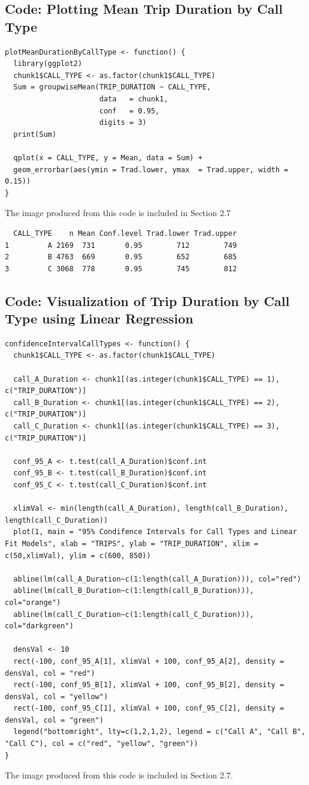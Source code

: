 \documentclass{article}
\numberwithin{equation}{section}
\begin{document}
\subsection{Code: Plotting Mean Trip Duration by Call Type} 

\begin{lstlisting}
plotMeanDurationByCallType <- function() {
  library(ggplot2)
  chunk1$CALL_TYPE <- as.factor(chunk1$CALL_TYPE)
  Sum = groupwiseMean(TRIP_DURATION ~ CALL_TYPE,
                      data   = chunk1,
                      conf   = 0.95,
                      digits = 3)
  print(Sum)
  
  qplot(x = CALL_TYPE, y = Mean, data = Sum) +
  geom_errorbar(aes(ymin = Trad.lower, ymax  = Trad.upper, width = 0.15))
}  
\end{lstlisting}
The image produced from this code is included in Section 2.7 
\begin{verbatim}
  CALL_TYPE    n Mean Conf.level Trad.lower Trad.upper
1         A 2169  731       0.95        712        749
2         B 4763  669       0.95        652        685
3         C 3068  778       0.95        745        812    
\end{verbatim}

\subsection{Code: Visualization of Trip Duration by Call Type using Linear Regression} 
\begin{lstlisting}
confidenceIntervalCallTypes <- function() { 
  chunk1$CALL_TYPE <- as.factor(chunk1$CALL_TYPE)
  
  call_A_Duration <- chunk1[(as.integer(chunk1$CALL_TYPE) == 1), c("TRIP_DURATION")]
  call_B_Duration <- chunk1[(as.integer(chunk1$CALL_TYPE) == 2), c("TRIP_DURATION")]
  call_C_Duration <- chunk1[(as.integer(chunk1$CALL_TYPE) == 3), c("TRIP_DURATION")]
  
  conf_95_A <- t.test(call_A_Duration)$conf.int
  conf_95_B <- t.test(call_B_Duration)$conf.int
  conf_95_C <- t.test(call_C_Duration)$conf.int

  xlimVal <- min(length(call_A_Duration), length(call_B_Duration), length(call_C_Duration))
  plot(1, main = "95% Condifence Intervals for Call Types and Linear Fit Models", xlab = "TRIPS", ylab = "TRIP_DURATION", xlim = c(50,xlimVal), ylim = c(600, 850))
  
  abline(lm(call_A_Duration~c(1:length(call_A_Duration))), col="red")
  abline(lm(call_B_Duration~c(1:length(call_B_Duration))), col="orange")
  abline(lm(call_C_Duration~c(1:length(call_C_Duration))), col="darkgreen")
  
  densVal <- 10
  rect(-100, conf_95_A[1], xlimVal + 100, conf_95_A[2], density = densVal, col = "red")
  rect(-100, conf_95_B[1], xlimVal + 100, conf_95_B[2], density = densVal, col = "yellow")
  rect(-100, conf_95_C[1], xlimVal + 100, conf_95_C[2], density = densVal, col = "green")
  legend("bottomright", lty=c(1,2,1,2), legend = c("Call A", "Call B", "Call C"), col = c("red", "yellow", "green"))
}
\end{lstlisting}
The image produced from this code is included in Section 2.7.
\end{document}
